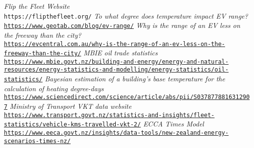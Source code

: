 \documentclass[
]{article}
\begin{document}
\begin{thebibliography}{9}
\textit{Flip the Fleet Website}
\\\texttt{https://flipthefleet.org/}
\textit{To what degree does temperature impact EV range?}
\\\texttt{\url{https://www.geotab.com/blog/ev-range/}}
\textit{Why is the range of an EV less on the freeway than the city?}
\\\texttt{\url{https://evcentral.com.au/why-is-the-range-of-an-ev-less-on-the-freeway-than-the-city/}}
\textit{MBIE oil trade statistics}
\\\texttt{\url{https://www.mbie.govt.nz/building-and-energy/energy-and-natural-resources/energy-statistics-and-modelling/energy-statistics/oil-statistics/}}
\textit{Bayesian estimation of a building's base temperature for the calculation of heating degree-days}
\\\texttt{\url{https://www.sciencedirect.com/science/article/abs/pii/S0378778816312907}}
\textit{Ministry of Transport VKT data website}
\\\texttt{\url{https://www.transport.govt.nz/statistics-and-insights/fleet-statistics/vehicle-kms-travelled-vkt-2/}}
\textit{ECCA Times Model}
\\\texttt{\url{https://www.eeca.govt.nz/insights/data-tools/new-zealand-energy-scenarios-times-nz/}}
\end{thebibliography}
\end{document}

